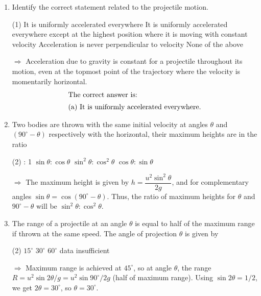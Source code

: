 \documentclass{article}
\renewcommand{\frac}[2]{\dfrac{#1}{#2}}
\newenvironment{solution}{\par\noindent\color{red!85!black}$\Rightarrow$\vspace{0em}}{}
\begin{document}
  \begin{enumerate}
    \item Identify the correct statement related to the projectile motion.
        \begin{tasks}(1)
            \task It is uniformly accelerated everywhere
            \task It is uniformly accelerated everywhere except at the highest position where it is moving with constant velocity
            \task Acceleration is never perpendicular to velocity
            \task None of the above\ans
        \end{tasks}
    \begin{solution}
        Acceleration due to gravity is constant for a projectile throughout its motion, even at the topmost point of the trajectory where the velocity is momentarily horizontal.
        \begin{align*}
            \intertext{The correct answer is:}
            \text{(a) It is uniformly accelerated everywhere.}
        \end{align*}
    \end{solution}
    
    \item Two bodies are thrown with the same initial velocity at angles $\theta$ and $(90^\circ-\theta)$ respectively with the horizontal, their maximum heights are in the ratio
        \begin{tasks}(2)
             : 1
            \task $\sin{\theta} : \cos{\theta}$
            \task $\sin^2{\theta} : \cos^2{\theta}$\ans
            \task $\cos{\theta} : \sin{\theta}$
        \end{tasks}
    \begin{solution}
        The maximum height is given by $h=\frac{u^2\sin^2{\theta}}{2g}$, and for complementary angles $\sin{\theta}=\cos{(90^\circ-\theta)}$. Thus, the ratio of maximum heights for $\theta$ and $90^\circ-\theta$ will be $\sin^2{\theta}:\cos^2{\theta}$.
    \end{solution}
    
    \item The range of a projectile at an angle $\theta$ is equal to half of the maximum range if thrown at the same speed. The angle of projection $\theta$ is given by
        \begin{tasks}(2)
            \task $15^\circ$
            \task $30^\circ$\ans
            \task $60^\circ$
            \task data insufficient
        \end{tasks}
    \begin{solution}
        Maximum range is achieved at $45^\circ$, so at angle $\theta$, the range $R=u^2\sin{2\theta}/g=u^2\sin{90^\circ}/2g$ (half of maximum range). Using $\sin{2\theta}=1/2$, we get $2\theta=30^\circ$, so $\theta=30^\circ$.
    \end{solution}
    

\end{enumerate}
\end{document}
